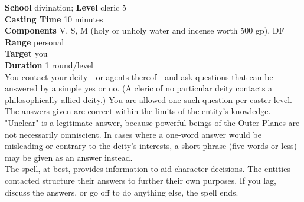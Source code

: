 \textbf{School} divination; \textbf{Level} cleric 5\\
\textbf{Casting Time} 10 minutes\\
\textbf{Components} V, S, M (holy or unholy water and incense worth 500 gp), DF\\
\textbf{Range} personal\\
\textbf{Target} you\\
\textbf{Duration} 1 round/level\\
You contact your deity---or agents thereof---and ask questions that can be answered by a simple yes or no. (A cleric of no particular deity contacts a philosophically allied deity.) You are allowed one such question per caster level. The answers given are correct within the limits of the entity's knowledge. "Unclear" is a legitimate answer, because powerful beings of the Outer Planes are not necessarily omniscient. In cases where a one-word answer would be misleading or contrary to the deity's interests, a short phrase (five words or less) may be given as an answer instead.\\
The spell, at best, provides information to aid character decisions. The entities contacted structure their answers to further their own purposes. If you lag, discuss the answers, or go off to do anything else, the spell ends.\\
